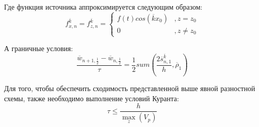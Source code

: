 Где функция источника аппроксимируется следующим образом:
$$
f_{x,n}^{\overline k}=f_{z,n}^{\overline k}=\left\{
  \begin{array}{ccc}
    f(t)cos(\overline k x_0) & , z=z_0 \\
    0 & , z\neq z_0
  \end{array}
\right.
$$

А граничные условия:
$$
\frac{\overline w_{n+1, \frac{1}{2}} - \overline w_{n, \frac{1}{2}}}{\tau}
= \frac{1}{2} sum(\frac{2\overline s_{n,1}^{\overline k}}{h}, \overline\rho_1)
$$

Для того, чтобы обеспечить сходимость представленной выше явной разностной схемы, также необходимо выполнение условий Куранта:
\begin{equation}
\label{eq:10}
\tau \leq \frac{h}{\max\limits_z\left({V_p}\right)}
\end{equation}

\clearpage
